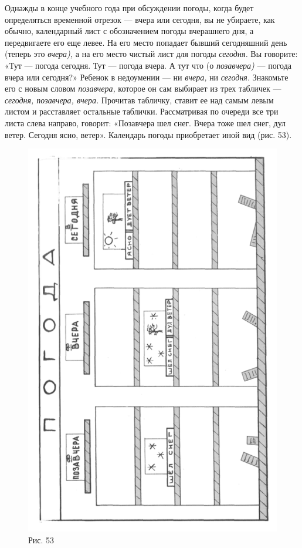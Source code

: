 \documentclass[a5paper]{book}
\renewcommand{\emph}[1]{\textit{#1}}
\begin{document}
Однажды в конце учебного года при обсуждении погоды, когда будет
определяться временной отрезок --- вчера или сегодня, вы не убираете,
как обычно, календарный лист с обозначением погоды вчерашнего дня, а
передвигаете его еще левее. На его место попадает бывший сегодняшний
день (теперь это \emph{вчера),} а на его место чистый лист для погоды
\emph{сегодня.} Вы говорите: «Тут --- погода сегодня. Тут --- погода
вчера. А тут что (о \emph{позавчера)} --- погода вчера или сегодня?»
Ребенок в недоумении --- ни \emph{вчера,} ни \emph{сегодня.} Знакомьте
его с новым словом \emph{позавчера,} которое он сам выбирает из трех
табличек --- \emph{сегодня, позавчера, вчера.} Прочитав табличку, ставит
ее над самым левым листом и расставляет остальные таблички. Рассматривая
по очереди все три листа слева направо, говорит: «Позавчера шел снег.
Вчера тоже шел снег, дул ветер. Сегодня ясно, ветер». Календарь погоды
приобретает иной вид (рис. 53).

\begin{figure}
\centering
\includegraphics[width=0.9\linewidth]{media/media/image49.png}
\caption*{Рис. 53}
\end{figure}
\end{document}

